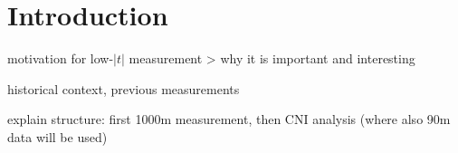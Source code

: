 \section{Introduction}

\> motivation for low-$|t|$ measurement
\>> why it is important and interesting

\> historical context, previous measurements

\> explain structure: first 1000m measurement, then CNI analysis (where also 90m data will be used)
